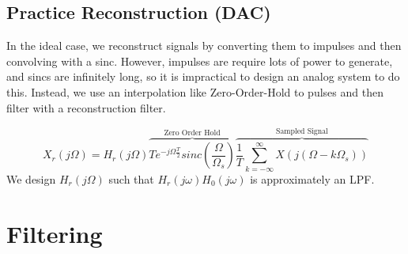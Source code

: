 \documentclass{article}
\begin{document}
\subsection{Practice Reconstruction (DAC)}
In the ideal case, we reconstruct signals by converting them to impulses and then convolving with a sinc.
However, impulses are require lots of power to generate, and sincs are infinitely long, so it is impractical to design an analog system to do this.
Instead, we use an interpolation like Zero-Order-Hold to pulses and then filter with a reconstruction filter.
\begin{figure}[H]
  \centering
\end{figure}
$$X_r(j\Omega) = H_r(j\Omega)\overbrace{Te^{-j\Omega\frac{T}{2}}sinc\left(\frac{\Omega}{\Omega_s}\right)}^{\text{Zero Order Hold}}\overbrace{\frac{1}{T}\sum_{k=-\infty}^{\infty}X(j(\Omega-k\Omega_s))}^{\text{Sampled Signal}}$$
We design $H_r(j\Omega)$ such that $H_r(j\omega)H_0(j\omega)$ is approximately an LPF.
\section{Filtering}
\end{document}
